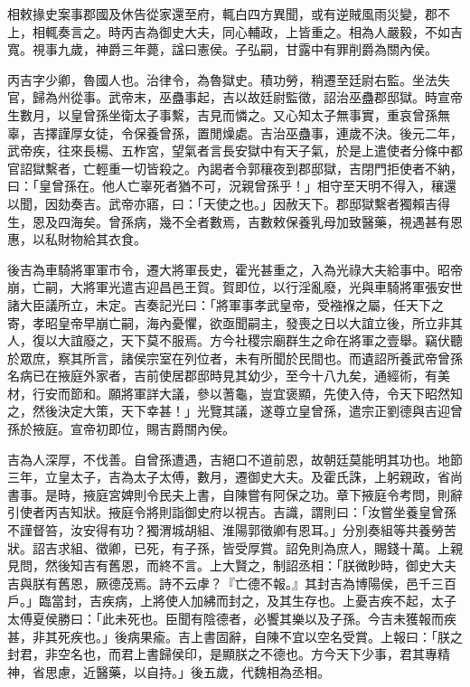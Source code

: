 \begin{pinyinscope}
相敕掾史案事郡國及休告從家還至府，輒白四方異聞，或有逆賊風雨災變，郡不上，相輒奏言之。時丙吉為御史大夫，同心輔政，上皆重之。相為人嚴毅，不如吉寬。視事九歲，神爵三年薨，諡曰憲侯。子弘嗣，甘露中有罪削爵為關內侯。

丙吉字少卿，魯國人也。治律令，為魯獄史。積功勞，稍遷至廷尉右監。坐法失官，歸為州從事。武帝末，巫蠱事起，吉以故廷尉監徵，詔治巫蠱郡邸獄。時宣帝生數月，以皇曾孫坐衛太子事繫，吉見而憐之。又心知太子無事實，重哀曾孫無辜，吉擇謹厚女徒，令保養曾孫，置閒燥處。吉治巫蠱事，連歲不決。後元二年，武帝疾，往來長楊、五柞宮，望氣者言長安獄中有天子氣，於是上遣使者分條中都官詔獄繫者，亡輕重一切皆殺之。內謁者令郭穰夜到郡邸獄，吉閉門拒使者不納，曰：「皇曾孫在。他人亡辜死者猶不可，況親曾孫乎！」相守至天明不得入，穰還以聞，因劾奏吉。武帝亦寤，曰：「天使之也。」因赦天下。郡邸獄繫者獨賴吉得生，恩及四海矣。曾孫病，幾不全者數焉，吉數敕保養乳母加致醫藥，視遇甚有恩惠，以私財物給其衣食。

後吉為車騎將軍軍市令，遷大將軍長史，霍光甚重之，入為光祿大夫給事中。昭帝崩，亡嗣，大將軍光遣吉迎昌邑王賀。賀即位，以行淫亂廢，光與車騎將軍張安世諸大臣議所立，未定。吉奏記光曰：「將軍事孝武皇帝，受襁褓之屬，任天下之寄，孝昭皇帝早崩亡嗣，海內憂懼，欲亟聞嗣主，發喪之日以大誼立後，所立非其人，復以大誼廢之，天下莫不服焉。方今社稷宗廟群生之命在將軍之壹舉。竊伏聽於眾庶，察其所言，諸侯宗室在列位者，未有所聞於民間也。而遺詔所養武帝曾孫名病已在掖庭外家者，吉前使居郡邸時見其幼少，至今十八九矣，通經術，有美材，行安而節和。願將軍詳大議，參以蓍龜，豈宜褒顯，先使入侍，令天下昭然知之，然後決定大策，天下幸甚！」光覽其議，遂尊立皇曾孫，遣宗正劉德與吉迎曾孫於掖庭。宣帝初即位，賜吉爵關內侯。

吉為人深厚，不伐善。自曾孫遭遇，吉絕口不道前恩，故朝廷莫能明其功也。地節三年，立皇太子，吉為太子太傅，數月，遷御史大夫。及霍氏誅，上躬親政，省尚書事。是時，掖庭宮婢則令民夫上書，自陳嘗有阿保之功。章下掖庭令考問，則辭引使者丙吉知狀。掖庭令將則詣御史府以視吉。吉識，謂則曰：「汝嘗坐養皇曾孫不謹督笞，汝安得有功？獨渭城胡組、淮陽郭徵卿有恩耳。」分別奏組等共養勞苦狀。詔吉求組、徵卿，已死，有子孫，皆受厚賞。詔免則為庶人，賜錢十萬。上親見問，然後知吉有舊恩，而終不言。上大賢之，制詔丞相：「朕微眇時，御史大夫吉與朕有舊恩，厥德茂焉。詩不云虖？『亡德不報。』其封吉為博陽侯，邑千三百戶。」臨當封，吉疾病，上將使人加紼而封之，及其生存也。上憂吉疾不起，太子太傅夏侯勝曰：「此未死也。臣聞有陰德者，必饗其樂以及子孫。今吉未獲報而疾甚，非其死疾也。」後病果瘉。吉上書固辭，自陳不宜以空名受賞。上報曰：「朕之封君，非空名也，而君上書歸侯印，是顯朕之不德也。方今天下少事，君其專精神，省思慮，近醫藥，以自持。」後五歲，代魏相為丞相。


\end{pinyinscope}
